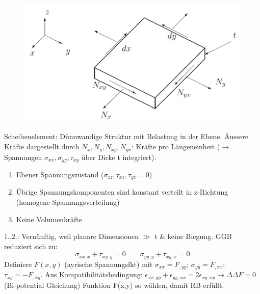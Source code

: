 \documentclass[a4paper,10pt]{article}
\begin{document}
\begin{multicols*}{3}
        \vspace{-2mm}
        \begin{figure}
            \includegraphics[width=\linewidth]{Scheibe}
        \end{figure}
        Scheibenelement: Dünnwandige Struktur mit Belastung in der Ebene. Äussere Kräfte dargestellt durch $N_x,N_y,N_{xy},N_{yx}$: Kräfte pro Längeneinheit ($\rightarrow$ Spannungen $\sigma_{xx},\sigma_{yy},\tau_{xy}$ über Dicke t integriert).
        
        \vspace{-5mm}
        \begin{enumerate}[noitemsep]
            \item Ebener Spannungszustand ($\sigma_{zz},\tau_{xz},\tau_{yz}=0$)
            \item Übrige Spannungskomponenten sind konstant verteilt in z-Richtung (homogene Spannungsverteilung)
            \item Keine Volumenkräfte
        \end{enumerate}
        1.,2.: Vernünftig, weil planare Dimensionen $\gg$ t \& keine Biegung. GGB reduziert sich zu:
        \[\sigma_{xx,x} + \tau_{xy,y}=0\quad\quad\sigma_{yy,y} + \tau_{xy,x}=0\]
        Definiere $F(x,y)$ (ayrische Spannungsfkt) mit $\sigma_{xx}=F_{,yy}$; $\sigma_{yy}=F_{,xx}$; $\tau_{xy}=-F_{,xy}$. Aus Kompatibilitätsbedingung: $\epsilon_{xx,yy}+\epsilon_{yy,xx}=2\epsilon_{xy,xy} \rightarrow \Delta\Delta F=0$ (Bi-potential Gleichung) Funktion F(x,y) so wählen, damit RB erfüllt.
        

\end{multicols*}
\end{document}
